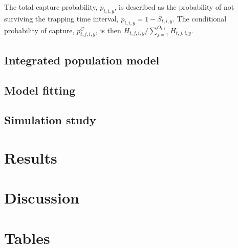\documentclass{article}
\begin{document}
The total capture probability, $p_{t,i,y}$, is described as the probability of not surviving the trapping time interval, $p_{t,i,y} = 1-S_{t,i,y}$. The conditional probability of capture, $p^C_{t,j,i,y}$, is then $H_{t,j,i,y}/\sum_{j=1}^{O_{t,i}}H_{t,j,i,y}$.

\subsection{Integrated population model}

\subsection{Model fitting}

\subsection{Simulation study}


\section{Results}

\section{Discussion}

\newpage

\section{Tables}

\renewcommand{\arraystretch}{1.25}
\end{document}

